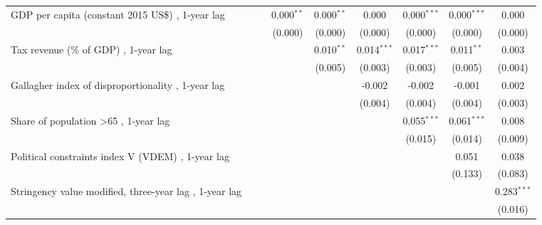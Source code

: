 \begin{table}[htbp]
\begin{tabular}{lcccccccc}
      GDP per capita (constant 2015 US\$) , 1-year lag                         &         &         & 0.000$^{**}$ & 0.000$^{**}$ & 0.000         & 0.000$^{***}$ & 0.000$^{***}$ & 0.000\\   
                                                                               &         &         & (0.000)      & (0.000)      & (0.000)       & (0.000)       & (0.000)       & (0.000)\\   
      Tax revenue (\% of GDP) , 1-year lag                                     &         &         &              & 0.010$^{**}$ & 0.014$^{***}$ & 0.017$^{***}$ & 0.011$^{**}$  & 0.003\\   
                                                                               &         &         &              & (0.005)      & (0.003)       & (0.003)       & (0.005)       & (0.004)\\   
      Gallagher index of disproportionality , 1-year lag                       &         &         &              &              & -0.002        & -0.002        & -0.001        & 0.002\\   
                                                                               &         &         &              &              & (0.004)       & (0.004)       & (0.004)       & (0.003)\\   
      Share of population >65 , 1-year lag                                     &         &         &              &              &               & 0.055$^{***}$ & 0.061$^{***}$ & 0.008\\   
                                                                               &         &         &              &              &               & (0.015)       & (0.014)       & (0.009)\\   
      Political constraints index V (VDEM) , 1-year lag                        &         &         &              &              &               &               & 0.051         & 0.038\\   
                                                                               &         &         &              &              &               &               & (0.133)       & (0.083)\\   
      Stringency value modified, three-year lag , 1-year lag                   &         &         &              &              &               &               &               & 0.283$^{***}$\\   
                                                                               &         &         &              &              &               &               &               & (0.016)\\   

\end{tabular}
\end{table}
